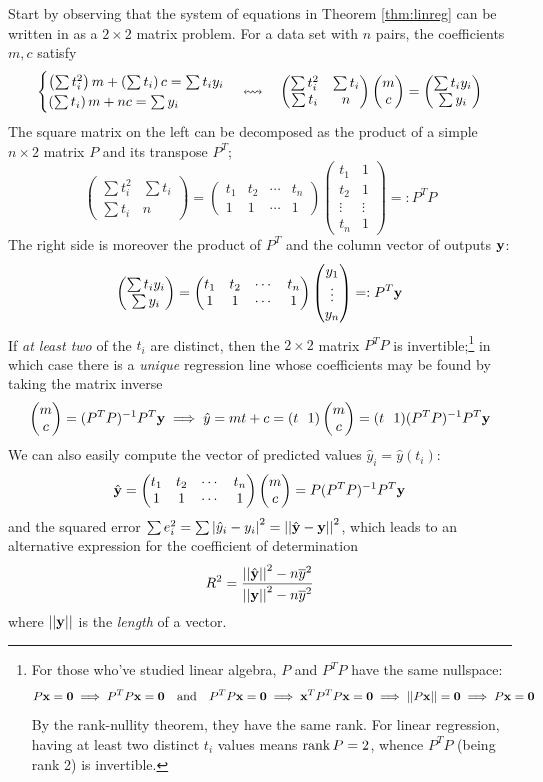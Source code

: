 Start by observing that the system of equations in Theorem \ref{thm:linreg} can be written in as a $2\times 2$ matrix problem. For a data set with $n$ pairs, the coefficients $m,c$ satisfy
\[
	\begin{cases}
		\left(\sum t_i^2\right)m+\left(\sum t_i\right)c=\sum t_iy_i\\
		\left(\sum t_i\right)m+nc=\sum y_i
	\end{cases}
	\leftrightsquigarrow\quad
	\begin{pmatrix}
		\sum t_i^2&\sum t_i\\
		\sum t_i&n
	\end{pmatrix}
	\begin{pmatrix}m\\c\end{pmatrix}=\begin{pmatrix}\sum t_iy_i\\\sum y_i\end{pmatrix}
\]
The square matrix on the left can be decomposed as the product of a simple $n\times 2$ matrix $P$ and its transpose $P^T$;
\[
	\begin{pmatrix}
		\sum t_i^2&\sum t_i\\
		\sum t_i&n
	\end{pmatrix}
	=
	\begin{pmatrix}
		t_1&t_2&\cdots&t_n\\
		1&1&\cdots&1
	\end{pmatrix}
	\begin{pmatrix}
		t_1&1\\
		t_2&1\\
		\vdots&\vdots\\
		t_n&1
	\end{pmatrix}
	=:P^TP
\]
The right side is moreover the product of $P^T$ and the column vector of outputs ${\mathbf{y}}$:
\[
	\begin{pmatrix}\sum t_iy_i\\\sum y_i\end{pmatrix}=
	\begin{pmatrix}
		t_1&t_2&\cdots&t_n\\
		1&1&\cdots&1
	\end{pmatrix}
	\begin{pmatrix}y_1\\\vdots\\y_n\end{pmatrix}=:P^T{\mathbf{y}}
\]
If \emph{at least two} of the $t_i$ are distinct, then the $2\times 2$ matrix $P^TP$ is invertible;\footnote{%
	For those who've studied linear algebra, $P$ and $P^TP$ have the same nullspace:
	\[
		P{\mathbf{x}}=\mathbf{0}\implies P^TP{\mathbf{x}}=\mathbf{0}\quad\text{and}\quad P^TP{\mathbf{x}}=\mathbf{0}\implies {\mathbf{x}}^TP^TP{\mathbf{x}}=\mathbf{0}\implies \left| \left| P{\mathbf{x}}\right|\right|=\mathbf{0}\implies P{\mathbf{x}}=\mathbf{0}
	\]
	By the rank-nullity theorem, they have the same rank. For linear regression, having at least two distinct $t_i$ values means $\operatorname{rank} P=2$, whence $P^TP$ (being rank 2) is invertible.
}
in which case there is a \emph{unique} regression line whose coefficients may be found by taking the matrix inverse
\[
	\twovec mc=(P^TP)^{-1}P^T\vy \implies \hat y=mt+c=(t\ \ 1)\twovec mc=(t\ \ 1)(P^TP)^{-1}P^T\vy
\]
We can also easily compute the vector of predicted values $\hat y_i=\hat y(t_i)$:
\[
	\hat{{\mathbf{y}}}=
	\begin{pmatrix}
		t_1&t_2&\cdots&t_n\\
		1&1&\cdots&1
	\end{pmatrix}
	\begin{pmatrix}m\\c\end{pmatrix}=P(P^TP)^{-1}P^T{\mathbf{y}}
\]
and the squared error $\sum e_i^2=\sum\left| \hat y_i-y_i\right|^2=\left| \left| \hat{{\mathbf{y}}}-{\mathbf{y}}\right|\right|^2$, which leads to an alternative expression for the coefficient of determination
\[
	R^2=\frac{\left| \left| \hat{{\mathbf{y}}}\right|\right|^2-n\overline{y}^2}{\left| \left| {\mathbf{y}}\right|\right|^2-n\overline{y}^2}
\]
where $\left| \left| {\mathbf{y}}\right|\right|$ is the \emph{length} of a vector.


